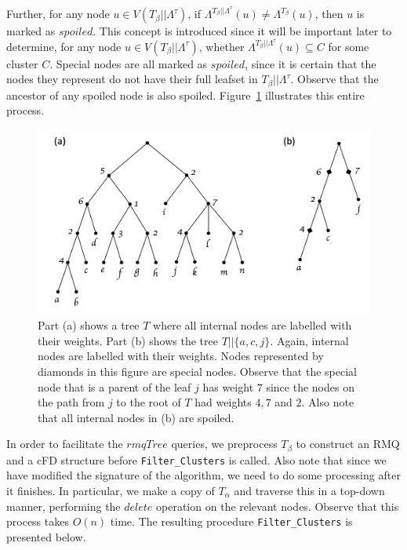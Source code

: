 \documentclass{article}
\newcommand{\leafset}{\Lambda}
\newcommand{\TA}{T_\alpha}
\newcommand{\TB}{T_\beta}
\begin{document}
    Further, for any node $u \in V(\TB||\leafset^{\tau})$, if $\leafset^{\TB||\leafset^{\tau}}(u) \neq \leafset^{\TB}(u)$, then $u$ is marked as $spoiled$. This concept is introduced since it will be important later to determine, for any node $u \in V(\TB||\leafset^{\tau})$, whether $\leafset^{\TB||\leafset^{\tau}}(u) \subseteq C$ for some cluster $C$. Special nodes are all marked as $spoiled$, since it is certain that the nodes they represent do not have their full leafset in $\TB||\leafset^{\tau}$. Observe that the ancestor of any spoiled node is also spoiled. Figure~\ref{fig:specialnodes} illustrates this entire process.

    \begin{figure}[ht]
        \includegraphics[scale=0.5]{specialnodes}
        \centering
        \caption{Part (a) shows a tree $T$ where all internal nodes are labelled with their weights. Part (b) shows the tree $T||\{a, c, j\}$. Again, internal nodes are labelled with their weights. Nodes represented by diamonds in this figure are special nodes. Observe that the special node that is a parent of the leaf $j$ has weight $7$ since the nodes on the path from $j$ to the root of $T$ had weights $4, 7$ and $2$. Also note that all internal nodes in (b) are spoiled.}
        \label{fig:specialnodes}
    \end{figure}

    In order to facilitate the $rmqTree$ queries, we preprocess $\TB$ to construct an RMQ and a cFD structure before \texttt{Filter\_Clusters} is called. Also note that since we have modified the signature of the algorithm, we need to do some processing after it finishes. In particular, we make a copy of $\TA$ and traverse this in a top-down manner, performing the $delete$ operation on the relevant nodes. Observe that this process takes $O(n)$ time. The resulting procedure \texttt{Filter\_Clusters} is presented below.
\end{document}
